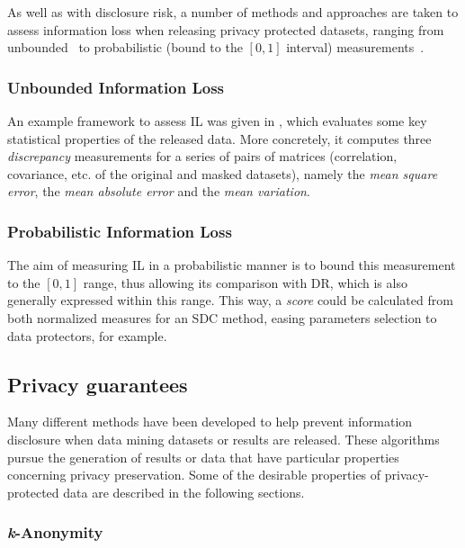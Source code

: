 As well as with disclosure risk, a number of methods and approaches are taken to assess information loss when releasing privacy protected datasets, ranging from unbounded~\citep{Domingo:SDCMethodsInfoLoss} to probabilistic (bound to the $[0,1]$ interval) measurements~\citep{Mateo:ProbInfLossMeasures}.

\subsubsection*{Unbounded Information Loss}

An example framework to assess IL was given in \citep{Domingo:SDCMethodsInfoLoss}, which evaluates some key statistical properties of the released data. More concretely, it computes three \textit{discrepancy} measurements for a series of pairs of matrices (correlation, covariance, etc. of the original and masked datasets), namely the \textit{mean square error}, the \textit{mean absolute error} and the \textit{mean variation}.

\subsubsection*{Probabilistic Information Loss}

The aim of measuring IL in a probabilistic manner is to bound this measurement to the $[0,1]$ range, thus allowing its comparison with DR, which is also generally expressed within this range. This way, a \textit{score} could be calculated from both normalized measures for an SDC method, easing parameters selection to data protectors, for example.

\subsection{Privacy guarantees}
\label{Theory::SDC::Guarantees}


Many different methods have been developed to help prevent information disclosure when data mining datasets or results are released. These algorithms pursue the generation of results or data that have particular properties concerning privacy preservation. Some of the desirable properties of privacy-protected data are described in the following sections.

\subsubsection{\textit{k}-Anonymity}

